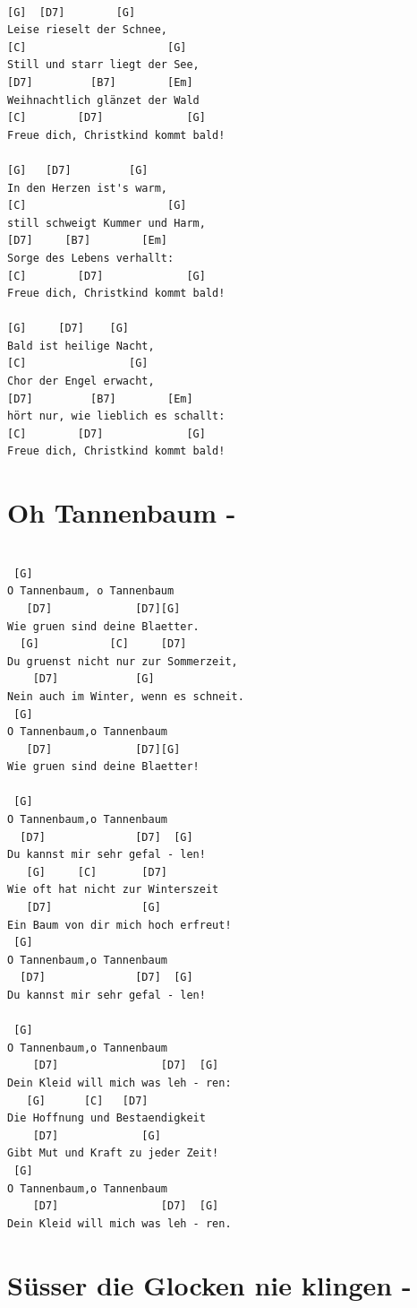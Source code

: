 \documentclass[
]{book}
\let\stdsection\section
\renewcommand\section{\clearpage\stdsection}
\begin{document}
\begin{verbatim}

[G]  [D7]        [G]
Leise rieselt der Schnee,
[C]                      [G]
Still und starr liegt der See,
[D7]         [B7]        [Em]
Weihnachtlich glänzet der Wald
[C]        [D7]             [G]
Freue dich, Christkind kommt bald!

[G]   [D7]         [G]
In den Herzen ist's warm,
[C]                      [G]
still schweigt Kummer und Harm,
[D7]     [B7]        [Em]
Sorge des Lebens verhallt:
[C]        [D7]             [G]
Freue dich, Christkind kommt bald!

[G]     [D7]    [G]
Bald ist heilige Nacht,
[C]                [G]
Chor der Engel erwacht,
[D7]         [B7]        [Em]
hört nur, wie lieblich es schallt:
[C]        [D7]             [G]
Freue dich, Christkind kommt bald!
\end{verbatim}

\hypertarget{oh-tannenbaum--}{%
\section{Oh Tannenbaum -}\label{oh-tannenbaum--}}

\begin{verbatim}

 [G]          
O Tannenbaum, o Tannenbaum
   [D7]             [D7][G]      
Wie gruen sind deine Blaetter.
  [G]           [C]     [D7]     
Du gruenst nicht nur zur Sommerzeit,
    [D7]            [G]     
Nein auch im Winter, wenn es schneit.
 [G]      
O Tannenbaum,o Tannenbaum
   [D7]             [D7][G]     
Wie gruen sind deine Blaetter!
  
 [G]  
O Tannenbaum,o Tannenbaum 
  [D7]              [D7]  [G]      
Du kannst mir sehr gefal - len!
   [G]     [C]       [D7]       
Wie oft hat nicht zur Winterszeit
   [D7]              [G]     
Ein Baum von dir mich hoch erfreut!
 [G]  
O Tannenbaum,o Tannenbaum
  [D7]              [D7]  [G]     
Du kannst mir sehr gefal - len!

 [G]    
O Tannenbaum,o Tannenbaum
    [D7]                [D7]  [G]     
Dein Kleid will mich was leh - ren:
   [G]      [C]   [D7]  
Die Hoffnung und Bestaendigkeit
    [D7]             [G]  
Gibt Mut und Kraft zu jeder Zeit!
 [G]  
O Tannenbaum,o Tannenbaum
    [D7]                [D7]  [G]     
Dein Kleid will mich was leh - ren. 
\end{verbatim}

\hypertarget{suxfcsser-die-glocken-nie-klingen--}{%
\section{Süsser die Glocken nie klingen -}\label{suxfcsser-die-glocken-nie-klingen--}}
\end{document}
